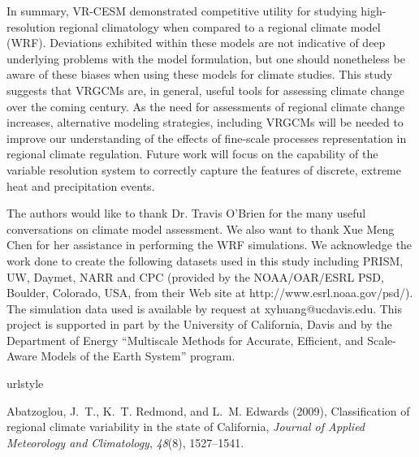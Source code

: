 \documentclass[draft,ms]{agutex}   %
\begin{document}
\begin{article}
In summary, VR-CESM demonstrated competitive utility for studying high-resolution regional climatology when compared to a regional climate model (WRF). Deviations exhibited within these models are not indicative of deep underlying problems with the model formulation, but one should nonetheless be aware of these biases when using these models for climate studies. This study suggests that VRGCMs are, in general, useful tools for assessing climate change over the coming century. As the need for assessments of regional climate change increases, alternative modeling strategies, including VRGCMs will be needed to improve our understanding of the effects of fine-scale processes representation in regional climate regulation. Future work will focus on the capability of the variable resolution system to correctly capture the features of discrete, extreme heat and precipitation events.



\begin{acknowledgments}


The authors would like to thank Dr. Travis O'Brien for the many useful conversations on climate model assessment. We also want to thank Xue Meng Chen for her assistance in performing the WRF simulations. We acknowledge the work done to create the following datasets used in this study including PRISM, UW, Daymet, NARR and CPC (provided by the NOAA/OAR/ESRL PSD, Boulder, Colorado, USA, from their Web site at http://www.esrl.noaa.gov/psd/). The simulation data used is available by request at xyhuang@ucdavis.edu. This project is supported in part by the University of California, Davis and by the Department of Energy ``Multiscale Methods for Accurate, Efficient, and Scale-Aware Models of the Earth System'' program. 
\end{acknowledgments}



\begin{thebibliography}{72}
\providecommand{\natexlab}[1]{#1}
\expandafter\ifx\csname urlstyle\endcsname\relax
  \providecommand{\doi}[1]{doi:\discretionary{}{}{}#1}\else
  \providecommand{\doi}{doi:\discretionary{}{}{}\begingroup
  \urlstyle{rm}\Url}\fi

Abatzoglou, J.~T., K.~T. Redmond, and L.~M. Edwards (2009), {Classification of
  regional climate variability in the state of California}, \textit{Journal of
  Applied Meteorology and Climatology}, \textit{48}(8), 1527--1541.


\end{thebibliography}
\end{article}
\end{document}
